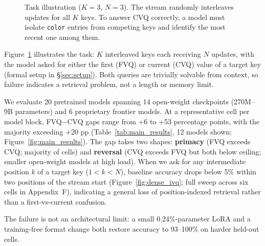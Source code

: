 \documentclass[letterpaper]{article} %
\begin{document}
\begin{figure}[t]
\centering
{\small
{}
}
\caption{Task illustration ($K{=}3$, $N{=}3$). The stream randomly
interleaves updates for all $K$ keys. To answer CVQ correctly, a
model must isolate \texttt{color} entries from competing keys and
identify the most recent one among them.}
\label{fig:task}
\end{figure}

Figure~\ref{fig:task} illustrates the task: $K$ interleaved keys
each receiving $N$ updates, with the model asked for either the
first (FVQ) or current (CVQ) value of a target key (formal setup in
\S\ref{sec:setup}). Both queries are trivially solvable from
context, so failure indicates a retrieval problem, not a length or
memory limit.

We evaluate 20 pretrained models spanning 14 open-weight checkpoints
(270M--9B parameters) and 6 proprietary frontier models.
At a representative cell per model block, FVQ$-$CVQ gaps range from
+6 to +53 percentage points, with the majority exceeding +20 pp
(Table~\ref{tab:main_results}, 12 models shown;
Figure~\ref{fig:main_results}).
The gap takes two shapes: \textbf{primacy} (FVQ exceeds CVQ;
majority of cells) and \textbf{reversal} (CVQ exceeds FVQ but both
below ceiling; smaller open-weight models at high load).
When we ask for any intermediate position $k$ of a target key
($1 < k < N$), baseline accuracy drops below 5\% within two
positions of the stream start
(Figure~\ref{fig:dense_ivq}; full sweep across six cells in
Appendix~F), indicating a general loss of
position-indexed retrieval rather than a first-vs-current confusion.

The failure is not an architectural limit: a small
0.24\%-parameter LoRA and a training-free format change both
restore accuracy to 93--100\% on harder held-out cells.
\end{document}
